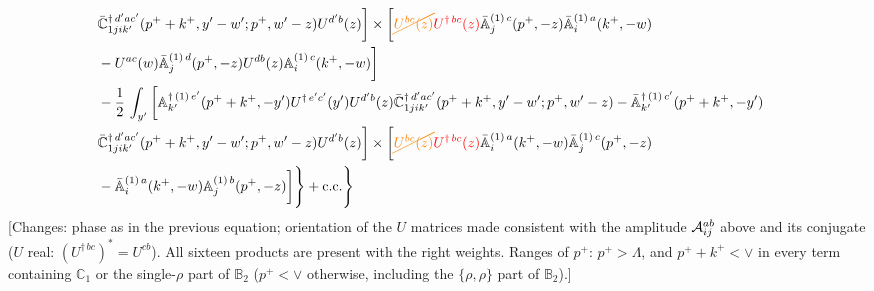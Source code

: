 \documentclass[aps,prd,amsmath,amssymb,nofootinbib]{revtex4-2}
\def\mf#1{\mathbb{#1}}
\numberwithin{equation}{section}
\begin{document}
\begin{align}
\\ & \Bar{\mf{C}}^{\dagger\, d^{\prime}ac^{\prime}}_{1jik^{\prime}}(p^{+}+k^{+},y^{\prime}-w^{\prime}; p^{+},w^{\prime}-z)U^{d^{\prime}b}(z)\bigg] \times  \bigg[{\color{orange}\cancel{U^{bc}(z)}}{\color{red}U^{\dagger\, bc}(z)}\Bar{\mf{A}}^{(1)\, c}_{j}(p^{+},-z)\Bar{\mf{A}}^{(1)\, a}_{i}(k^{+},-w)\notag \\ & -U^{ac}(w) \Bar{\mf{A}}^{(1)\, d}_{j}(p^{+},-z)U^{db}(z) \mf{A}^{(1)\, c}_{i}(k^{+},- w)\bigg]\notag \\ & - \frac{1}{2}\,\int_{y^{\prime}}\bigg[\mf{A}^{\dagger\, (1)\,e^{\prime}}_{k^{\prime}}(p^{+}+k^{+},-y^{\prime})U^{\dagger\, e^{\prime}c^{\prime}}(y^{\prime})U^{d^{\prime}b}(z) \Bar{\mf{C}}^{\dagger\, d^{\prime}ac^{\prime}}_{1jik^{\prime}}(p^{+}+k^{+},y^{\prime}-w^{\prime}; p^{+},w^{\prime}-z)  -\Bar{\mf{A}}^{\dagger\, (1)\,c^{\prime}}_{k^{\prime}}(p^{+}+k^{+},-y^{\prime})\notag \\ & \Bar{\mf{C}}^{\dagger\, d^{\prime}ac^{\prime}}_{1jik^{\prime}}(p^{+}+k^{+},y^{\prime}-w^{\prime}; p^{+},w^{\prime}-z)U^{d^{\prime}b}(z)\bigg] \times \bigg[{\color{orange}\cancel{U^{bc}(z)}}{\color{red}U^{\dagger\, bc}(z)}\Bar{\mf{A}}^{(1)\, a}_{i}(k^{+},- w)\Bar{\mf{A}}^{(1)\, c}_{j}(p^{+},-z)\notag \\ & -\Bar{\mf{A}}^{(1)\, a}_{i}(k^{+},- w) \mf{A}^{(1)\, b}_{j}(p^{+},- z)\bigg]\Bigg\} +  {\rm c.c.} \Bigg\}
\end{align} {\color{red}[Changes: phase as in the previous equation; orientation of the $U$ matrices made consistent with the amplitude ${\cal A}^{ab}_{ij}$ above and its conjugate ($U$ real: $(U^{\dagger\, bc})^{*}=U^{cb}$). All sixteen products are present with the right weights. Ranges of $p^+$: $p^+>\Lambda$, and $p^++k^+<\vee$ in every term containing $\mf{C}_1$ or the single-$\rho$ part of $\mf{B}_2$ ($p^+<\vee$ otherwise, including the $\{\rho,\rho\}$ part of $\mf{B}_2$).]}\par\noindent 
\newpage
\appendix
\end{document}
